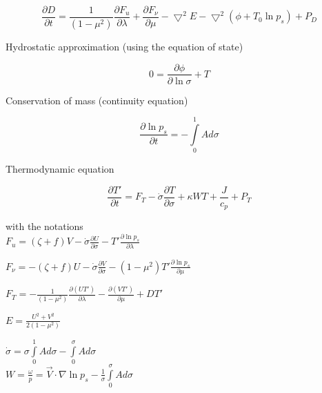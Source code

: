 \begin{equation}
{\displaystyle \frac{\partial D}{\partial t} = \frac{1}{(1 - \mu^2)} \frac{\partial F_u}{\partial \lambda} + \frac{\partial F_\nu}{\partial \mu} - \bigtriangledown^2 E - \bigtriangledown^2 (\phi + T_0 \ln p_s ) + P_D}\label{div}
\end{equation}


Hydrostatic approximation (using the equation of state)

\begin{equation}
{\displaystyle 0 = \frac{\partial \phi}{\partial \ln \sigma} + T} \label{hydroute}
\end{equation}


Conservation of mass (continuity equation)

\begin{equation}
{\displaystyle \frac{\partial \ln p_s}{\partial t} 
= - \int\limits_{0}^{1} A d \sigma}\label{konti}
\end{equation}


Thermodynamic equation

\begin{equation}
{\displaystyle \frac{\partial T'}{\partial t} = F_T - \dot{\sigma}
  \frac{\partial T}{\partial \sigma} + \kappa W T   + \frac{J}{c_p} + P_{T}}
\label{temp} 
\end{equation}


with the notations\\


${\displaystyle F_u = ( \zeta + f ) V - \dot{\sigma} \frac{\partial U}{\partial \sigma} - T' \frac{\partial \ln p_s}{\partial \lambda}}$


${\displaystyle F_\nu = - (\zeta + f)U - \dot{\sigma} \frac{\partial V}{\partial\sigma} - (1 - \mu^2) T' \frac{\partial \ln p_s}{\partial \mu}}$



${\displaystyle F_T =  - \frac{1}{(1 - \mu^2)} \frac{\partial (U T')}{\partial \lambda} - \frac{\partial (VT')}{\partial \mu} + D T'} $

${\displaystyle E = \frac{U^2 + V^2}{2(1 - \mu^2)}}$


${\displaystyle
\dot {\sigma}=  \sigma \int\limits_{0}^{1} A d \sigma
-  \int\limits_{0}^{\sigma} A d \sigma  }$\\


${\displaystyle
W= \frac {\omega} {p} =
\vec{V} \cdot  \nabla \ln p_s - \frac{1}{\sigma}\int\limits_{0}^{\sigma} A d
\sigma  }$\\

